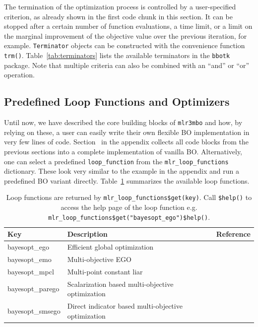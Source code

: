 \documentclass[12pt,letterpaper]{article}
\newcommand{\citeauthorsup}[1]{\citeauthor{#1}\textsuperscript{\cite{#1}}}
\begin{document}
\label{sec:termination}

The termination of the optimization process is controlled by a user-specified criterion, as already shown in the first code chunk in this section.
It can be stopped after a certain number of function evaluations, a time limit, or a limit on the marginal improvement of the objective value over the previous iteration, for example.
\texttt{Terminator} objects can be constructed with the convenience function \texttt{trm()}.
Table~\ref{tab:terminators} lists the available terminators in the \texttt{bbotk} package.
Note that multiple criteria can also be combined with an ``and'' or ``or'' operation.


\subsection*{Predefined Loop Functions and Optimizers}
\label{sec:predefined-loop-functions}

Until now, we have described the core building blocks of \texttt{mlr3mbo} and how, by relying on these, a user can easily write their own flexible BO implementation in very few lines of code.
Section~ in the appendix collects all code blocks from the previous sections into a complete implementation of vanilla BO.
Alternatively, one can select a predefined \texttt{loop\_function} from the \texttt{mlr\_loop\_functions} dictionary.
These look very similar to the example in the appendix and run a predefined BO variant directly. 
Table~\ref{tab:loop-functions} summarizes the available loop functions.

\begin{table}[ht]
  \centering
  \caption{
    Loop functions are returned by \texttt{mlr\_loop\_functions\$get(key)}.
    Call \texttt{\$help()} to access the help page of the loop function e.g. \texttt{mlr\_loop\_functions\$get("bayesopt\_ego")\$help()}.}
  \label{tab:loop-functions}
  \begin{tabularx}{\textwidth}{lXl}
    \toprule
    Key             & Description                                          & Reference                        \\
    \midrule
    bayesopt\_ego    & Efficient global optimization                       & \protect\citeauthorsup{snoek2012}\protect\citeauthorsup{jones1998} \\
    bayesopt\_emo    & Multi-objective EGO                                 & \protect\citeauthorsup{huang2006}                \\
    bayesopt\_mpcl   & Multi-point constant liar                            & \protect\citeauthorsup{ginsbourger2008}\citeauthorsup{wang2020} \\
    bayesopt\_parego & Scalarization based multi-objective optimization    & \protect\citeauthorsup{knowles2006}               \\
    bayesopt\_smsego & Direct indicator based multi-objective optimization & \protect\citeauthorsup{beume2007}\citeauthorsup{ponweiser2008}  \\
    \bottomrule
  \end{tabularx}
\end{table}
\end{document}
